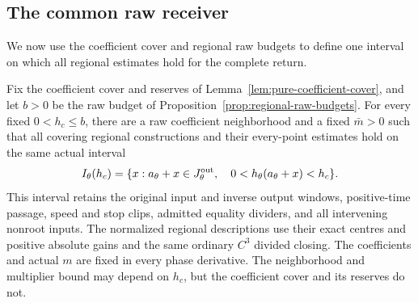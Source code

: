 \subsection{The common raw receiver}
\label{sec:conclusion}

We now use the coefficient cover and regional raw budgets to define one
interval on which all regional estimates hold for the complete return.

\begin{lemma}\label{lem:common-raw-receiver}
Fix the coefficient cover and reserves of
Lemma~\ref{lem:pure-coefficient-cover}, and let \(b>0\) be the raw
budget of Proposition~\ref{prop:regional-raw-budgets}. For every fixed
\(0<h_c\le b\), there are a raw coefficient neighborhood and a
fixed \(\bar m>0\) such that all covering regional constructions
and their every-point estimates hold on the same actual interval
\begin{equation}\label{eq:common-raw-carrier}
 I_\theta(h_c)=\{x:a_\theta+x\in J_\theta^{\rm out},\quad
                    0<h_\theta(a_\theta+x)<h_c\}.
\end{equation}
This interval retains the original input and inverse output windows,
positive-time passage, speed and stop clips, admitted equality dividers,
and all intervening nonroot inputs. The normalized regional descriptions
use their exact centres and positive absolute gains and the same ordinary
\(C^3\) divided closing. The coefficients and actual \(m\) are fixed
in every phase derivative. The neighborhood and multiplier bound may
depend on \(h_c\), but the coefficient cover and its reserves do not.
\end{lemma}

